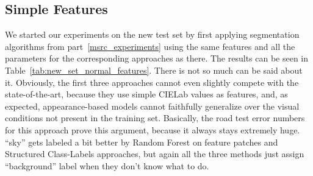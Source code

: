 \clearpage


\subsection{Simple Features}
\label{sec:same_setting_new_set}

We started our experiments on the new test set by first applying segmentation algorithms from part~\ref{msrc_experiments} using the same features and
all the parameters for the corresponding approaches as there.
The results can be seen in Table~\ref{tab:new_set_normal_features}. There is not so much can be said about it. Obviously, the first three approaches
cannot even slightly compete with the state-of-the-art, because they use simple CIELab values as features, and, as expected, appearance-based models
cannot faithfully generalize over the visual conditions not present in the training set. Basically, the road test error numbers for this approach prove
this argument, because it always stays extremely huge. ``sky'' gets labeled a bit better by Random Forest on feature patches and Structured Class-Labels
approaches, but again all the three methods just assign ``background'' label when they don't know what to do.

